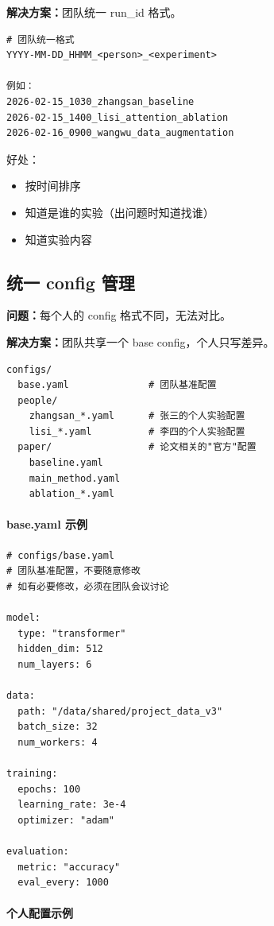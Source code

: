 \textbf{解决方案：}团队统一 run\_id 格式。

\begin{verbatim}
# 团队统一格式
YYYY-MM-DD_HHMM_<person>_<experiment>

例如：
2026-02-15_1030_zhangsan_baseline
2026-02-15_1400_lisi_attention_ablation
2026-02-16_0900_wangwu_data_augmentation
\end{verbatim}

好处：
\begin{itemize}
  \item 按时间排序
  \item 知道是谁的实验（出问题时知道找谁）
  \item 知道实验内容
\end{itemize}

\subsection{统一 config 管理}

\textbf{问题：}每个人的 config 格式不同，无法对比。

\textbf{解决方案：}团队共享一个 base config，个人只写差异。

\begin{verbatim}
configs/
  base.yaml              # 团队基准配置
  people/
    zhangsan_*.yaml      # 张三的个人实验配置
    lisi_*.yaml          # 李四的个人实验配置
  paper/                 # 论文相关的"官方"配置
    baseline.yaml
    main_method.yaml
    ablation_*.yaml
\end{verbatim}

\paragraph{base.yaml 示例}

\begin{verbatim}
# configs/base.yaml
# 团队基准配置，不要随意修改
# 如有必要修改，必须在团队会议讨论

model:
  type: "transformer"
  hidden_dim: 512
  num_layers: 6

data:
  path: "/data/shared/project_data_v3"
  batch_size: 32
  num_workers: 4

training:
  epochs: 100
  learning_rate: 3e-4
  optimizer: "adam"

evaluation:
  metric: "accuracy"
  eval_every: 1000
\end{verbatim}

\paragraph{个人配置示例}

